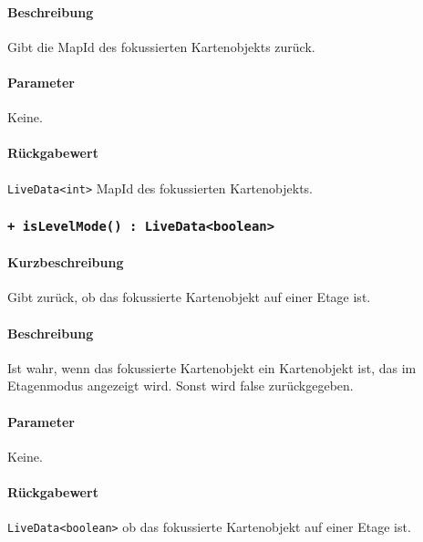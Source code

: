 \paragraph*{Beschreibung}
Gibt die MapId des fokussierten Kartenobjekts zurück.
\paragraph*{Parameter}
Keine.
\paragraph*{Rückgabewert}
\texttt{LiveData<int>} MapId des fokussierten Kartenobjekts.

\subsubsection*{\texttt{+ isLevelMode() : LiveData<boolean>}}%
\paragraph*{Kurzbeschreibung}
Gibt zurück, ob das fokussierte Kartenobjekt auf einer Etage ist.
\paragraph*{Beschreibung}
Ist wahr, wenn das fokussierte Kartenobjekt ein Kartenobjekt ist, das im Etagenmodus 
angezeigt wird. Sonst wird false zurückgegeben.
\paragraph*{Parameter}
Keine.
\paragraph*{Rückgabewert}
\texttt{LiveData<boolean>} ob das fokussierte Kartenobjekt auf einer Etage ist.